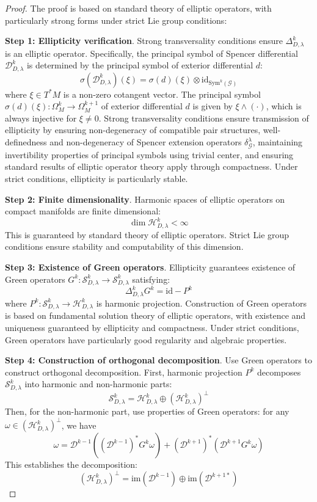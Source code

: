 \documentclass[10pt,a4paper]{amsart}
\begin{document}
\begin{proof}
The proof is based on standard theory of elliptic operators, with particularly strong forms under strict Lie group conditions:

\textbf{Step 1: Ellipticity verification}. Strong transversality conditions ensure $\Delta^k_{D,\lambda}$ is an elliptic operator. Specifically, the principal symbol of Spencer differential $\mathcal{D}^k_{D,\lambda}$ is determined by the principal symbol of exterior differential $d$:
$$\sigma(\mathcal{D}^k_{D,\lambda})(\xi) = \sigma(d)(\xi) \otimes \text{id}_{\mathrm{Sym}^k(\mathcal{G})}$$
where $\xi \in T^*M$ is a non-zero cotangent vector. The principal symbol $\sigma(d)(\xi): \Omega^k_M \to \Omega^{k+1}_M$ of exterior differential $d$ is given by $\xi \wedge (\cdot)$, which is always injective for $\xi \neq 0$. Strong transversality conditions ensure transmission of ellipticity by ensuring non-degeneracy of compatible pair structures, well-definedness and non-degeneracy of Spencer extension operators $\delta^{\lambda}_{\mathcal{G}}$, maintaining invertibility properties of principal symbols using trivial center, and ensuring standard results of elliptic operator theory apply through compactness. Under strict conditions, ellipticity is particularly stable.

\textbf{Step 2: Finite dimensionality}. Harmonic spaces of elliptic operators on compact manifolds are finite dimensional:
$$\dim \mathcal{H}^k_{D,\lambda} < \infty$$
This is guaranteed by standard theory of elliptic operators. Strict Lie group conditions ensure stability and computability of this dimension.

\textbf{Step 3: Existence of Green operators}. Ellipticity guarantees existence of Green operators $G^k: \mathcal{S}^k_{D,\lambda} \to \mathcal{S}^k_{D,\lambda}$ satisfying:
$$\Delta^k_{D,\lambda} G^k = \text{id} - P^k$$
where $P^k: \mathcal{S}^k_{D,\lambda} \to \mathcal{H}^k_{D,\lambda}$ is harmonic projection. Construction of Green operators is based on fundamental solution theory of elliptic operators, with existence and uniqueness guaranteed by ellipticity and compactness. Under strict conditions, Green operators have particularly good regularity and algebraic properties.

\textbf{Step 4: Construction of orthogonal decomposition}. Use Green operators to construct orthogonal decomposition. First, harmonic projection $P^k$ decomposes $\mathcal{S}^k_{D,\lambda}$ into harmonic and non-harmonic parts:
$$\mathcal{S}^k_{D,\lambda} = \mathcal{H}^k_{D,\lambda} \oplus (\mathcal{H}^k_{D,\lambda})^{\perp}$$
Then, for the non-harmonic part, use properties of Green operators: for any $\omega \in (\mathcal{H}^k_{D,\lambda})^{\perp}$, we have
$$\omega = \mathcal{D}^{k-1}((\mathcal{D}^{k-1})^* G^k \omega) + (\mathcal{D}^{k+1})^*(\mathcal{D}^{k+1} G^k \omega)$$
This establishes the decomposition:
$$(\mathcal{H}^k_{D,\lambda})^{\perp} = \mathrm{im}(\mathcal{D}^{k-1}) \oplus \mathrm{im}(\mathcal{D}^{k+1*})$$


\end{proof}
\end{document}
